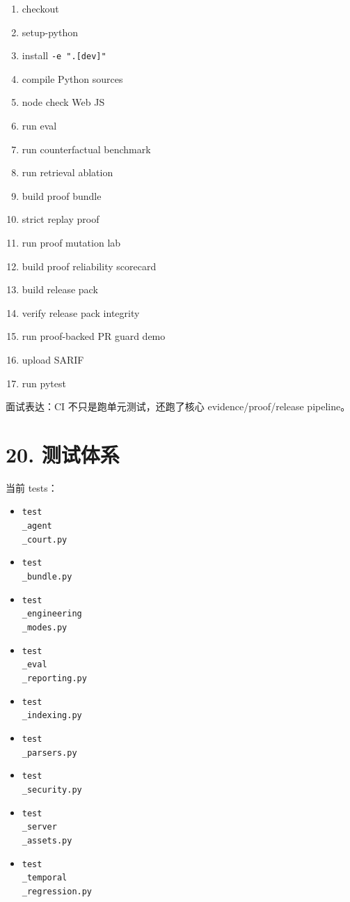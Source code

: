 \documentclass[UTF8,12pt,openany]{ctexbook}
\begin{document}
\begin{enumerate}
\item checkout
\item setup-python
\item install \texttt{-e ".[dev]"}
\item compile Python sources
\item node check Web JS
\item run eval
\item run counterfactual benchmark
\item run retrieval ablation
\item build proof bundle
\item strict replay proof
\item run proof mutation lab
\item build proof reliability scorecard
\item build release pack
\item verify release pack integrity
\item run proof-backed PR guard demo
\item upload SARIF
\item run pytest
\end{enumerate}

面试表达：CI 不只是跑单元测试，还跑了核心 evidence/proof/release pipeline。\par

\section{20. 测试体系}

当前 tests：\par

\begin{itemize}
\item \texttt{test\\_agent\\_court.py}
\item \texttt{test\\_bundle.py}
\item \texttt{test\\_engineering\\_modes.py}
\item \texttt{test\\_eval\\_reporting.py}
\item \texttt{test\\_indexing.py}
\item \texttt{test\\_parsers.py}
\item \texttt{test\\_security.py}
\item \texttt{test\\_server\\_assets.py}
\item \texttt{test\\_temporal\\_regression.py}
\end{itemize}
\end{document}
